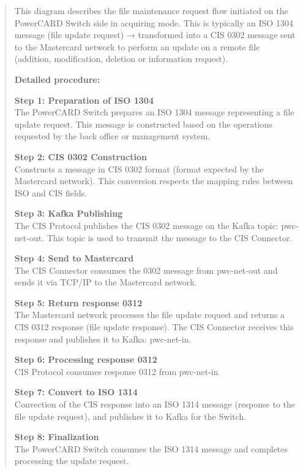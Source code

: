 \documentclass[12pt,a4paper]{report}
\begin{document}
\begin{quote}
This diagram describes the file maintenance request flow initiated on
the PowerCARD Switch side in acquiring mode. This is typically an ISO
1304 message (file update request) → transformed into a CIS 0302 message
sent to the Mastercard network to perform an update on a remote file
(addition, modification, deletion or information request).

\textbf{Detailed procedure:}

\textbf{Step 1: Preparation of ISO 1304}\\
The PowerCARD Switch prepares an ISO 1304 message representing a file
update request. This message is constructed based on the operations
requested by the back office or management system.

\textbf{Step 2: CIS 0302 Construction}\\
Constructs a message in CIS 0302 format (format expected by the
Mastercard network). This conversion respects the mapping rules between
ISO and CIS fields.

\textbf{Step 3: Kafka Publishing}\\
The CIS Protocol publishes the CIS 0302 message on the Kafka topic:
pwc-net-out. This topic is used to transmit the message to the CIS
Connector.

\textbf{Step 4: Send to Mastercard}\\
The CIS Connector consumes the 0302 message from pwc-net-out and sends
it via TCP/IP to the Mastercard network.

\textbf{Step 5: Return response 0312}\\
The Mastercard network processes the file update request and returns a
CIS 0312 response (file update response). The CIS Connector receives
this response and publishes it to Kafka: pwc-net-in.

\textbf{Step 6: Processing response 0312}\\
CIS Protocol consumes response 0312 from pwc-net-in

\textbf{Step 7: Convert to ISO 1314}\\
Convection of the CIS response into an ISO 1314 message (response to the
file update request), and publishes it to Kafka for the Switch.

\textbf{Step 8: Finalization}\\
The PowerCARD Switch consumes the ISO 1314 message and completes
processing the update request.
\end{quote}
\clearpage
\end{document}
